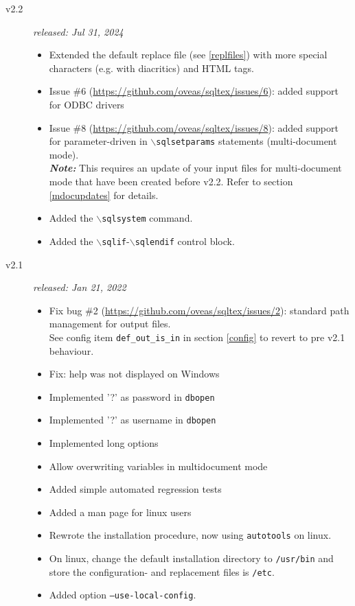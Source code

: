 \documentclass{article}
\newcommand{\bs}{\ensuremath{\backslash}}
\begin{document}
\begin{description}
\item[v2.2] \textit{released: Jul 31, 2024}
\begin{itemize}
\item Extended the default replace file (see \ref{replfiles}) with more special characters (e.g. with diacritics) and HTML tags.
\item Issue \#6 (\url{https://github.com/oveas/sqltex/issues/6}): added support for ODBC drivers
\item Issue \#8 (\url{https://github.com/oveas/sqltex/issues/8}): added support for parameter-driven in \texttt{\bs sqlsetparams} statements (multi-document mode).\\
\textit{\textbf{Note:}} This requires an update of your input files for multi-document mode that have been created before v2.2. Refer to section \ref{mdocupdates} for details.
\item Added the \texttt{\bs sqlsystem} command.
\item Added the \texttt{\bs sqlif}-\texttt{\bs sqlendif} control block.
\end{itemize}

\item[v2.1] \textit{released: Jan 21, 2022}
\begin{itemize}
\item Fix bug \#2 (\url{https://github.com/oveas/sqltex/issues/2}): standard path management for output files.\\
See config item \texttt{def\_out\_is\_in} in section \ref{config} to revert to pre v2.1 behaviour.
\item Fix: help was not displayed on Windows
\item Implemented '?' as password in \texttt{dbopen}
\item Implemented '?' as username in \texttt{dbopen}
\item Implemented long options
\item Allow overwriting variables in multidocument mode
\item Added simple automated regression tests
\item Added a man page for linux users
\item Rewrote the installation procedure, now using \texttt{autotools} on linux.
\item On linux, change the default installation directory to \texttt{/usr/bin} and store the configuration- and replacement files is \texttt{/etc}.
\item Added option \texttt{--use-local-config}.
\end{itemize}


\end{description}
\end{document}
